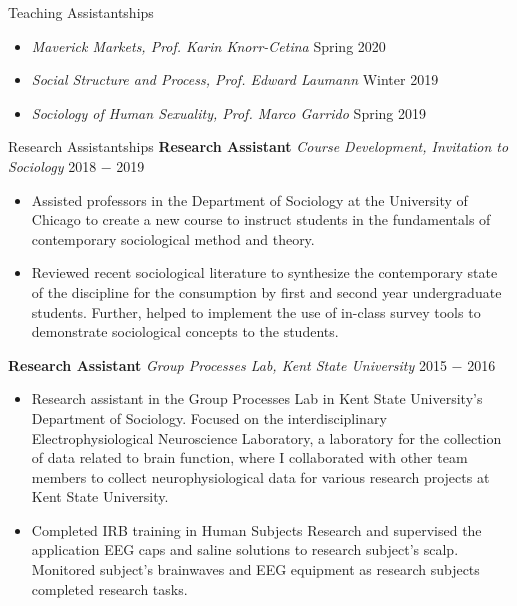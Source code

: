 \documentclass{resume}
\begin{document}
\begin{rSection}{Teaching Assistantships}
\begin{itemize}[noitemsep,nolistsep,leftmargin=*]
\item {\textit{Maverick Markets, Prof. Karin Knorr-Cetina} \hfill Spring 2020}
\item {\textit{Social Structure and Process, Prof. Edward Laumann} \hfill Winter 2019}
\item {\textit{Sociology of Human Sexuality, Prof. Marco Garrido} \hfill Spring 2019}
\end{itemize}

\begin{rSection}{Research Assistantships}
\noindent \textbf{Research Assistant} \textit{Course Development, Invitation to Sociology} \hfill  2018 $-$ 2019
\begin{itemize}[noitemsep,nolistsep,leftmargin=*]
\item { Assisted professors in the Department of Sociology at the University of Chicago to create a new course to instruct students in the fundamentals of contemporary sociological method and theory.}
\item { Reviewed recent sociological literature to synthesize the contemporary state of the discipline for the consumption by first and second year undergraduate students. Further, helped to implement the use of in-class survey tools to demonstrate sociological concepts to the students. \\}
\end{itemize}

\noindent \textbf{Research Assistant} \textit{Group Processes Lab, Kent State University} \hfill  2015 $-$ 2016
\begin{itemize}[noitemsep,nolistsep,leftmargin=*]
\item {Research assistant in the Group Processes Lab in Kent State University’s Department of Sociology. Focused on the interdisciplinary Electrophysiological Neuroscience Laboratory, a laboratory for the collection of data related to brain function, where I collaborated with other team members to collect neurophysiological data for various research projects at Kent State University.}
\item {Completed IRB training in Human Subjects Research and supervised the application EEG caps and saline solutions to research subject's scalp. Monitored subject's brainwaves and EEG equipment as research subjects completed research tasks.\\}
\end{itemize}


\end{rSection}
\end{rSection}
\end{document}
